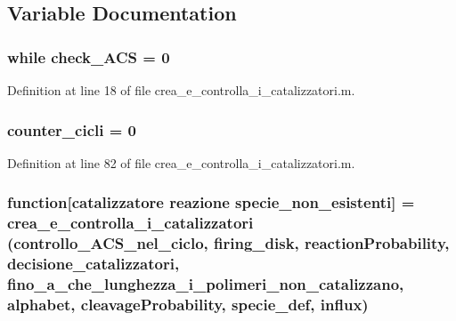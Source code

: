 \subsection{Variable Documentation}
\hypertarget{a00104_a516aa1002f0c1375a671e40ee7b79e07}{
\subsubsection[{check\-\_\-\-A\-C\-S}]{\setlength{\rightskip}{0pt plus 5cm}while check\-\_\-\-A\-C\-S = 0}}\label{a00104_a516aa1002f0c1375a671e40ee7b79e07}


Definition at line 18 of file crea\-\_\-e\-\_\-controlla\-\_\-i\-\_\-catalizzatori.\-m.

\hypertarget{a00104_a8b5c7ae18fb63e6cb42a3eac42f1f29e}{
\subsubsection[{counter\-\_\-cicli}]{\setlength{\rightskip}{0pt plus 5cm}counter\-\_\-cicli = 0}}\label{a00104_a8b5c7ae18fb63e6cb42a3eac42f1f29e}


Definition at line 82 of file crea\-\_\-e\-\_\-controlla\-\_\-i\-\_\-catalizzatori.\-m.

\hypertarget{a00104_a5e47fda8cc2a1711ddabe11a14ba8ecb}{
\subsubsection[{function}]{\setlength{\rightskip}{0pt plus 5cm}function\mbox{[}{\bf catalizzatore} {\bf reazione} {\bf specie\-\_\-non\-\_\-esistenti}\mbox{]} = {\bf crea\-\_\-e\-\_\-controlla\-\_\-i\-\_\-catalizzatori} (controllo\-\_\-\-A\-C\-S\-\_\-nel\-\_\-ciclo, {\bf firing\-\_\-disk}, {\bf reaction\-Probability}, {\bf decisione\-\_\-catalizzatori}, {\bf fino\-\_\-a\-\_\-che\-\_\-lunghezza\-\_\-i\-\_\-polimeri\-\_\-non\-\_\-catalizzano}, {\bf alphabet}, {\bf cleavage\-Probability}, {\bf specie\-\_\-def}, {\bf influx})}}\label{a00104_a5e47fda8cc2a1711ddabe11a14ba8ecb}


